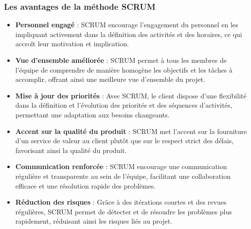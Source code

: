 \subsubsection{Les avantages de la méthode SCRUM}
\begin{itemize}
    \item \textbf{Personnel engagé} : SCRUM encourage l'engagement du personnel en les impliquant activement dans la définition des activités et des horaires, ce qui accroît leur motivation et implication.
    \item \textbf{Vue d'ensemble améliorée} : SCRUM permet à tous les membres de l’équipe de comprendre de manière homogène les objectifs et les tâches à accomplir, offrant ainsi une meilleure vue d’ensemble du projet.
    \item \textbf{Mise à jour des priorités} : Avec SCRUM, le client dispose d'une flexibilité dans la définition et l'évolution des priorités et des séquences d’activités, permettant une adaptation aux besoins changeants.
    \item \textbf{Accent sur la qualité du produit} : SCRUM met l’accent sur la fourniture d’un service de valeur au client plutôt que sur le respect strict des délais, favorisant ainsi la qualité du produit.
    \item \textbf{Communication renforcée} : SCRUM encourage une communication régulière et transparente au sein de l’équipe, facilitant une collaboration efficace et une résolution rapide des problèmes.
    \item \textbf{Réduction des risques} : Grâce à des itérations courtes et des revues régulières, SCRUM permet de détecter et de résoudre les problèmes plus rapidement, réduisant ainsi les risques liés au projet.
\end{itemize}



